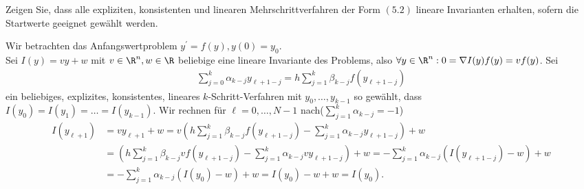 \begin{exercise}
  Zeigen Sie, dass alle expliziten, konsistenten und linearen
  Mehrschrittverfahren der Form $(5.2)$ lineare Invarianten
  erhalten, sofern die Startwerte geeignet gewählt werden.
\end{exercise}

\begin{solution}
  Wir betrachten das Anfangswertproblem $y^{\prime} = f(y), y(0) = y_0$. \\
  Sei $I(y) = vy + w$ mit $v \in \R^n, w \in \R$ beliebige eine lineare Invariante
  des Problems, also $\forall y \in \R^n: 0 = \nabla I(y)f(y) = vf(y)$.
  Sei
  \begin{align*}
    \sum_{j=0}^k \alpha_{k-j}y_{\ell+1-j} = h\sum_{j=1}^k \beta_{k-j}f(y_{\ell+1-j})
  \end{align*}
  ein beliebiges, explizites, konsistentes, lineares $k$-Schritt-Verfahren mit
  $y_0,\dots,y_{k-1}$ so gewählt, dass \\
   $I(y_0) = I(y_1) = \dots = I(y_{k-1})$.
  Wir rechnen für $\ell = 0,\dots,N-1$ nach($\sum_{j=1}^k \alpha_{k-j} = -1$)
  \begin{align*}
    I(y_{\ell+1}) &= vy_{\ell + 1} + w = v\left(h\sum_{j=1}^k \beta_{k-j}f(y_{\ell+1-j}) - \sum_{j=1}^k \alpha_{k-j}y_{\ell+1-j}\right) + w \\
    &= \left(h\sum_{j=1}^k \beta_{k-j}vf(y_{\ell+1-j}) - \sum_{j=1}^k \alpha_{k-j}vy_{\ell+1-j}\right) + w
    = -\sum_{j=1}^k \alpha_{k-j}\left(I(y_{\ell+1-j}) - w\right) + w \\
    &= -\sum_{j=1}^k \alpha_{k-j}\left(I(y_0) - w\right) + w
    = I(y_0) - w + w = I(y_0).
  \end{align*}
\end{solution}
